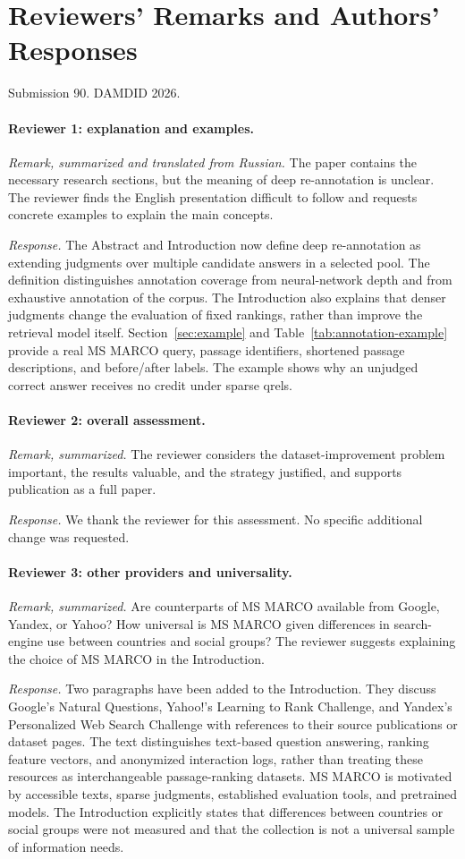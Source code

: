\section*{Reviewers' Remarks and Authors' Responses}
\noindent Submission 90. DAMDID 2026.

\paragraph{Reviewer 1: explanation and examples.}
\emph{Remark, summarized and translated from Russian.} The paper contains the necessary research sections, but the meaning of deep re-annotation is unclear. The reviewer finds the English presentation difficult to follow and requests concrete examples to explain the main concepts.

\emph{Response.} The Abstract and Introduction now define deep re-annotation as extending judgments over multiple candidate answers in a selected pool. The definition distinguishes annotation coverage from neural-network depth and from exhaustive annotation of the corpus. The Introduction also explains that denser judgments change the evaluation of fixed rankings, rather than improve the retrieval model itself. Section~\ref{sec:example} and Table~\ref{tab:annotation-example} provide a real MS MARCO query, passage identifiers, shortened passage descriptions, and before/after labels. The example shows why an unjudged correct answer receives no credit under sparse qrels.

\paragraph{Reviewer 2: overall assessment.}
\emph{Remark, summarized.} The reviewer considers the dataset-improvement problem important, the results valuable, and the strategy justified, and supports publication as a full paper.

\emph{Response.} We thank the reviewer for this assessment. No specific additional change was requested.

\paragraph{Reviewer 3: other providers and universality.}
\emph{Remark, summarized.} Are counterparts of MS MARCO available from Google, Yandex, or Yahoo? How universal is MS MARCO given differences in search-engine use between countries and social groups? The reviewer suggests explaining the choice of MS MARCO in the Introduction.

\emph{Response.} Two paragraphs have been added to the Introduction. They discuss Google's Natural Questions, Yahoo!'s Learning to Rank Challenge, and Yandex's Personalized Web Search Challenge with references to their source publications or dataset pages. The text distinguishes text-based question answering, ranking feature vectors, and anonymized interaction logs, rather than treating these resources as interchangeable passage-ranking datasets. MS MARCO is motivated by accessible texts, sparse judgments, established evaluation tools, and pretrained models. The Introduction explicitly states that differences between countries or social groups were not measured and that the collection is not a universal sample of information needs.
